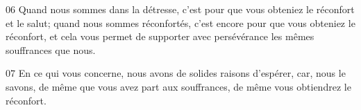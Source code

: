 
06 Quand nous sommes dans la détresse, c’est pour que vous obteniez le réconfort et le salut; quand nous sommes réconfortés, c’est encore pour que vous obteniez le réconfort, et cela vous permet de supporter avec persévérance les mêmes souffrances que nous.

07 En ce qui vous concerne, nous avons de solides raisons d’espérer, car, nous le savons, de même que vous avez part aux souffrances, de même vous obtiendrez le réconfort.
